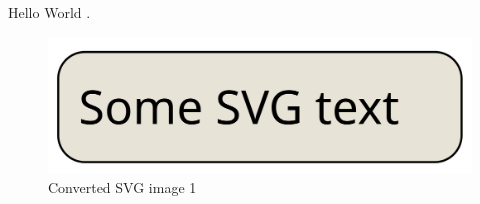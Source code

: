 \documentclass{article}
\begin{document}
Hello World \cite{ref1}.

\begin{figure}
  \centering
  \includegraphics[width=\linewidth]{img/image1}
  \caption{Converted SVG image 1}
\end{figure}



\end{document}
